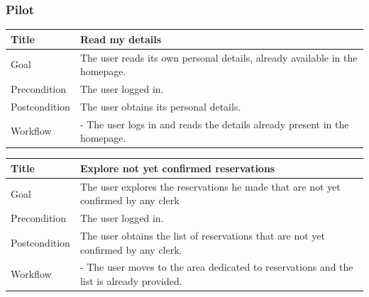 \documentclass{beamer}
\begin{document}
\begin{frame}
    \frametitle{Pilot}
    \begin{table}
        \tiny
        \begin{tabular}{|p{2cm}|p{6cm}|}
        \hline
        Title & \textbf{Read my details} \\
        \hline
        Goal & The user reads its own personal details, already available in the homepage.\\
        \hline
        Precondition & The user logged in. \\
        \hline
        Postcondition & The user obtains its personal details. \\
        \hline
        Workflow &
        - The user logs in and reads the details already present in the homepage. \\
        \hline
        \end{tabular}
\end{table}

\begin{table}
    \tiny
    \begin{tabular}{|p{2cm}|p{6cm}|}
    \hline
    Title & \textbf{Explore not yet confirmed reservations} \\
    \hline
    Goal & The user explores the reservations he made that are not yet confirmed by any clerk \\
    \hline
    Precondition & The user logged in. \\
    \hline
    Postcondition & The user obtains the list of reservations that are not yet confirmed by any clerk. \\
    \hline
    Workflow &
    - The user moves to the area dedicated to reservations and the list is already provided. \\
    \hline
    \end{tabular}
\end{table}

\end{frame}
\end{document}
